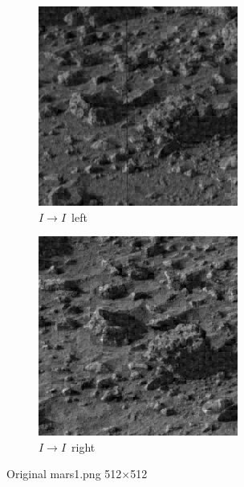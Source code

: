 \documentclass[10pt,twoside,titlepage]{article}
\newcommand{\sysII}{\mbox{$I \rightarrow I$}}
\begin{document}
\begin{figure}
    \centering
    \begin{subfigure}{0.5\textwidth}
        \centering
        \includegraphics[width=0.6\linewidth]{img/mars1_ii_left.png}
        \caption{\sysII\ left}
    \end{subfigure}%
    \begin{subfigure}{0.5\textwidth}
        \centering
        \includegraphics[width=0.6\linewidth]{img/mars1_ii_right.png}
        \caption{\sysII\ right}
    \end{subfigure}
    \caption{Original mars1.png 512$\times$512}
    \label{fig:mars1_orig}
\end{figure}
\end{document}
